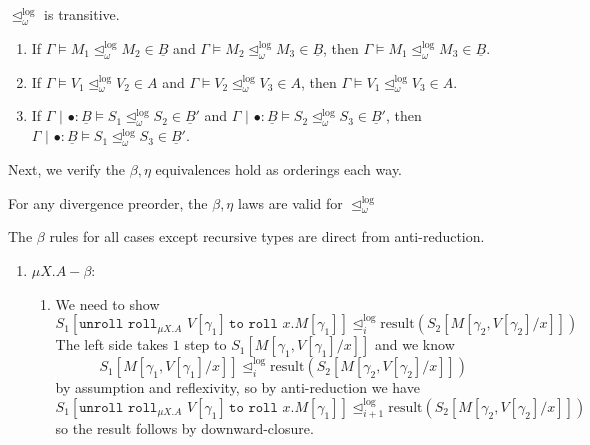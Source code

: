 \documentclass[acmsmall,nonacm]{acmart}
\newif\iflong
\renewcommand{\u}{\underline}
\newcommand{\pipe}{\,\,|\,\,}
\newcommand{\apreorder}{\trianglelefteq}
\newcommand{\ilrof}[2]{\mathrel{{#1}^{\text{log}}_{#2}}}
\newcommand{\ilr}[1]{\ilrof{\apreorder}{#1}}
\newcommand{\roll}{\kw{roll}}
\newcommand{\rollty}[1]{\texttt{roll}_{#1}\,\,}
\newcommand{\result}{\text{result}}
\newcommand{\kw}[1]{\texttt{#1}\,\,}
\newcommand{\pmmuXtoYinZ}[3]{\kw{unroll} #1 \,\kw{to} \roll #2. #3}
\begin{document}
{\begin{longproof}
\begin{enumerate}
  \end{enumerate}
\end{longproof}
\fi
\begin{corollary}
  \begin{shortonly}
    $\ilrof\apreorder \omega$ is transitive.
  \end{shortonly}
  \begin{longonly}
    \hfill
  \begin{enumerate}
  \item If $\Gamma \vDash M_1 \ilrof\apreorder \omega M_2 \in \u B$ and
    $\Gamma \vDash M_2 \ilrof\apreorder \omega M_3 \in \u B$, then
    $\Gamma \vDash M_1 \ilrof\apreorder \omega M_3 \in \u B$.
  \item If $\Gamma \vDash V_1 \ilrof\apreorder \omega V_2 \in A$ and
    $\Gamma \vDash V_2 \ilrof\apreorder \omega V_3 \in A$, then
    $\Gamma \vDash V_1 \ilrof\apreorder \omega V_3 \in A$.
  \item If $\Gamma \pipe \bullet : \u B \vDash S_1 \ilrof\apreorder \omega S_2 \in \u B'$ and
    $\Gamma\pipe \bullet : \u B \vDash S_2 \ilrof\apreorder \omega S_3 \in \u B'$, then
    $\Gamma\pipe \bullet : \u B \vDash S_1 \ilrof\apreorder \omega S_3 \in \u B'$.
  \end{enumerate}
  \end{longonly}
\end{corollary}

\iflong
Next, we verify the $\beta, \eta$ equivalences hold as orderings each
way.
\begin{lemma}[$\beta, \eta$]
  For any divergence preorder, the $\beta, \eta$
  laws are valid for $\ilrof\apreorder \omega$
\end{lemma}
\begin{longproof}
  The $\beta$ rules for all cases except recursive types are direct
  from anti-reduction.
  \begin{enumerate}
  \item $\mu X.A-\beta$:
    \begin{enumerate}
    \item We need to show
      \[ S_1[\pmmuXtoYinZ {\rollty{\mu X.A} V[\gamma_1]} x M[\gamma_1]] \ilr i \result(S_2[M[\gamma_2,V[\gamma_2]/x]]) \]
      The left side takes $1$ step to $S_1[M[\gamma_1,V[\gamma_1]/x]]$ and we know
      \[ S_1[M[\gamma_1,V[\gamma_1]/x]] \ilr i \result (S_2[M[\gamma_2,V[\gamma_2]/x]])  \]
      by assumption and reflexivity, so by anti-reduction we have
      \[ S_1[\pmmuXtoYinZ {\rollty{\mu X.A} V[\gamma_1]} x M[\gamma_1]] \ilr {i+1} \result(S_2[M[\gamma_2,V[\gamma_2]/x]]) \]
      so the result follows by downward-closure.
      

\end{enumerate}
\end{enumerate}
\end{longproof}}
\end{document}
